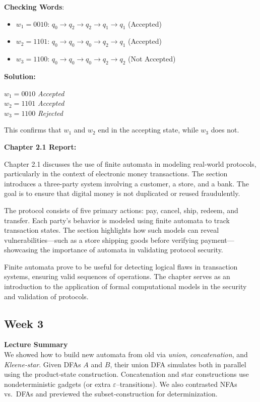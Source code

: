\documentclass{article}
\theoremstyle{theorem}
\theoremstyle{definition}
\theoremstyle{remark}
\begin{document}
\textbf{Checking Words}:
\begin{itemize}
    \item $w_1 = 0010$: $q_0 \to q_2 \to q_2 \to q_1 \to q_1$ \quad \checkmark (Accepted)
    \item $w_2 = 1101$: $q_0 \to q_0 \to q_0 \to q_2 \to q_1$ \quad \checkmark (Accepted)
    \item $w_3 = 1100$: $q_0 \to q_0 \to q_0 \to q_2 \to q_2$ \quad \xmark (Not Accepted)
\end{itemize}

\textbf{Solution:}

$w_1 = 0010$ \to \quad \checkmark \textit{Accepted} \\[0.3em]
$w_2 = 1101$ \to \quad \checkmark \textit{Accepted} \\[0.3em]
$w_3 = 1100$ \to \quad \xmark \textit{Rejected} 

This confirms that $w_1$ and $w_2$ end in the accepting state, while $w_3$ does not.


\textbf{Chapter 2.1 Report:}

Chapter 2.1 discusses the use of finite automata in modeling real-world protocols, particularly in the context of electronic money transactions. The section introduces a three-party system involving a customer, a store, and a bank. The goal is to ensure that digital money is not duplicated or reused fraudulently.

The protocol consists of five primary actions: pay, cancel, ship, redeem, and transfer. Each party's behavior is modeled using finite automata to track transaction states. The section highlights how such models can reveal vulnerabilities—such as a store shipping goods before verifying payment—showcasing the importance of automata in validating protocol security.

Finite automata prove to be useful for detecting logical flaws in transaction systems, ensuring valid sequences of operations. The chapter serves as an introduction to the application of formal computational models in the security and validation of protocols.




\subsection{Week 3}
\textbf{Lecture Summary}\\
We showed how to build new automata from old via \emph{union}, \emph{concatenation}, and \emph{Kleene‐star}.  Given DFAs $A$ and $B$, their union DFA simulates both in parallel using the product‐state construction.  Concatenation and star constructions use nondeterministic gadgets (or extra $\varepsilon$–transitions).  We also contrasted NFAs vs.\ DFAs and previewed the subset‐construction for determinization.
\end{document}
